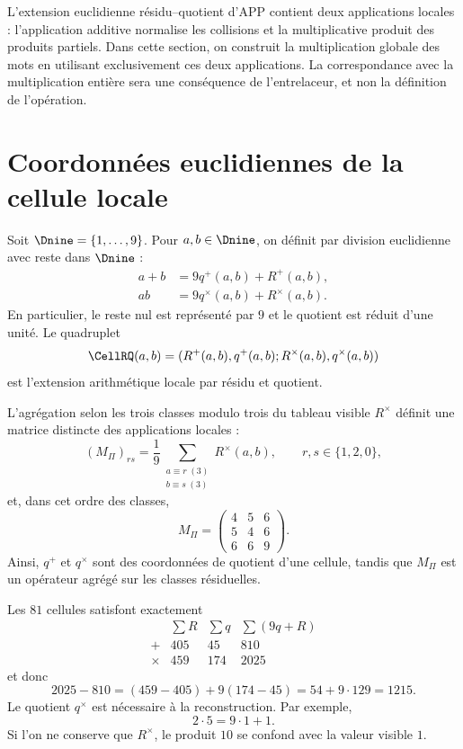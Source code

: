 \label{int:chap:producto-nativo}

L'extension euclidienne résidu--quotient d'APP contient deux applications
locales : l'application additive normalise les collisions et la multiplicative
produit des produits partiels. Dans cette section, on construit la multiplication
globale des mots en utilisant exclusivement ces deux applications. La correspondance avec la multiplication entière sera une
conséquence de l'entrelaceur, et non la définition de l'opération.

\section{Coordonnées euclidiennes de la cellule locale}

\begin{definition}
Soit $\Dnine=\{1,\ldots,9\}$. Pour $a,b\in\Dnine$, on définit par division
euclidienne avec reste dans $\Dnine$ :
\begin{align}
 a+b&=9q^+(a,b)+R^+(a,b),\label{int:eq:local-plus}\\
 ab&=9q^\times(a,b)+R^\times(a,b).\label{int:eq:local-times}
\end{align}
En particulier, le reste nul est représenté par $9$ et le quotient est réduit
d'une unité. Le quadruplet
\[
 \CellRQ(a,b)=
 (R^+(a,b),q^+(a,b);R^\times(a,b),q^\times(a,b))
\]
est l'extension arithmétique locale par résidu et quotient.
\end{definition}

L'agrégation selon les trois classes modulo trois du tableau visible
\(R^\times\) définit une matrice distincte des applications locales :
\[
(M_\Pi)_{rs}
=\frac19
\sum_{\substack{a\equiv r\;(3)\\b\equiv s\;(3)}}R^\times(a,b),
\qquad r,s\in\{1,2,0\},
\]
et, dans cet ordre des classes,
\[
M_\Pi=
\begin{pmatrix}4&5&6\\5&4&6\\6&6&9\end{pmatrix}.
\]
Ainsi, \(q^+\) et \(q^\times\) sont des coordonnées de quotient d'une cellule,
tandis que \(M_\Pi\) est un opérateur agrégé sur les classes résiduelles.

Les $81$ cellules satisfont exactement
\[
\begin{array}{c|rrrr}
 &\sum R&\sum q&\sum(9q+R)\\\hline
 +&405&45&810\\
 \times&459&174&2025
\end{array}
\]
et donc
\[
 2025-810=(459-405)+9(174-45)=54+9\cdot129=1215.
\]
Le quotient $q^\times$ est nécessaire à la reconstruction. Par exemple,
\[
 2\cdot5=9\cdot1+1.
\]
Si l'on ne conserve que $R^\times$, le produit $10$ se confond avec la valeur
visible $1$.

